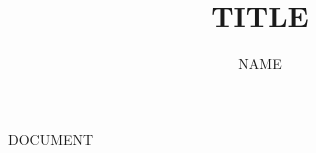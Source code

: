 \documentclass[12pt, letterpaper, twoside]{article}
\title{TITLE}
\author{NAME}
\date{}
\begin{document}
\begin{titlepage}
\maketitle
\end{titlepage}

DOCUMENT
\end{document}
